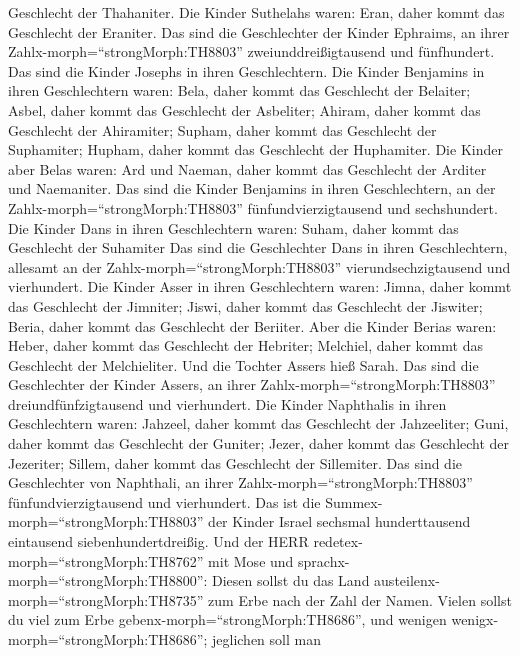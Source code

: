 Geschlecht der Thahaniter.  Die Kinder Suthelahs waren:
Eran, daher kommt das Geschlecht der Eraniter.  Das sind
die Geschlechter der Kinder Ephraims, an ihrer
Zahlx-morph=``strongMorph:TH8803'' zweiunddreißigtausend und
fünfhundert. Das sind die Kinder Josephs in ihren Geschlechtern.
 Die Kinder Benjamins in ihren Geschlechtern waren: Bela,
daher kommt das Geschlecht der Belaiter; Asbel, daher kommt das
Geschlecht der Asbeliter; Ahiram, daher kommt das Geschlecht der
Ahiramiter;  Supham, daher kommt das Geschlecht der
Suphamiter; Hupham, daher kommt das Geschlecht der Huphamiter.
 Die Kinder aber Belas waren: Ard und Naeman, daher kommt
das Geschlecht der Arditer und Naemaniter.  Das sind die
Kinder Benjamins in ihren Geschlechtern, an der
Zahlx-morph=``strongMorph:TH8803'' fünfundvierzigtausend und
sechshundert.  Die Kinder Dans in ihren Geschlechtern
waren: Suham, daher kommt das Geschlecht der Suhamiter  Das
sind die Geschlechter Dans in ihren Geschlechtern, allesamt an der
Zahlx-morph=``strongMorph:TH8803'' vierundsechzigtausend und
vierhundert.  Die Kinder Asser in ihren Geschlechtern
waren: Jimna, daher kommt das Geschlecht der Jimniter; Jiswi, daher
kommt das Geschlecht der Jiswiter; Beria, daher kommt das Geschlecht der
Beriiter.  Aber die Kinder Berias waren: Heber, daher kommt
das Geschlecht der Hebriter; Melchiel, daher kommt das Geschlecht der
Melchieliter.  Und die Tochter Assers hieß Sarah.
 Das sind die Geschlechter der Kinder Assers, an ihrer
Zahlx-morph=``strongMorph:TH8803'' dreiundfünfzigtausend und
vierhundert.  Die Kinder Naphthalis in ihren Geschlechtern
waren: Jahzeel, daher kommt das Geschlecht der Jahzeeliter; Guni, daher
kommt das Geschlecht der Guniter;  Jezer, daher kommt das
Geschlecht der Jezeriter; Sillem, daher kommt das Geschlecht der
Sillemiter.  Das sind die Geschlechter von Naphthali, an
ihrer Zahlx-morph=``strongMorph:TH8803'' fünfundvierzigtausend und
vierhundert.  Das ist die
Summex-morph=``strongMorph:TH8803'' der Kinder Israel sechsmal
hunderttausend eintausend siebenhundertdreißig.  Und der
HERR redetex-morph=``strongMorph:TH8762'' mit Mose und
sprachx-morph=``strongMorph:TH8800'':  Diesen sollst du das
Land austeilenx-morph=``strongMorph:TH8735'' zum Erbe nach der Zahl der
Namen.  Vielen sollst du viel zum Erbe
gebenx-morph=``strongMorph:TH8686'', und wenigen
wenigx-morph=``strongMorph:TH8686''; jeglichen soll man
